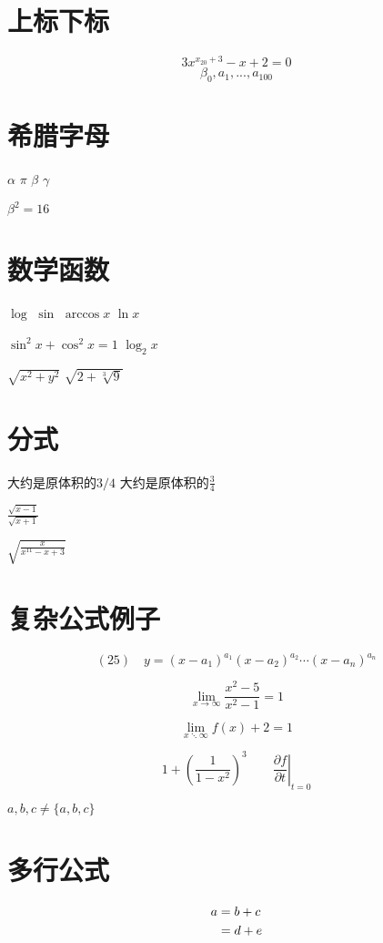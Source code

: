 \documentclass{article}
\begin{document}
	\section{上标下标}
	$$3x^{x_{20} + 3} - x + 2 = 0$$
	$$\beta_0,a_1,...,a_{100}$$
	\section{希腊字母} 
	$\alpha$
	$\pi$
	$\beta$
	$\gamma$

	$\beta^2 = 16$

	\section{数学函数}
	$\log$
	$\sin$
	$\arccos x$
	$\ln x$

	$\sin^2 x+\cos^2 x = 1$
	$\log_2 x$

	$\sqrt{x ^ 2 + y ^ 2}$
	$\sqrt{2 + \sqrt[3]{9}}$ %

	\section{分式}
	大约是原体积的$3/4$
	大约是原体积的$\frac{3}{4}$

	$\frac{\sqrt{x-1}}{\sqrt{x+1}}$

	$\sqrt{\frac{x}{x^{11} - x + 3}}$

	\section{复杂公式例子}

	\[
	(25)\quad y=\left(x-a_{1}\right)^{a_{1}}\left(x-a_{2}\right)^{a_{2}} \cdots\left(x-a_{n}\right)^{a_{n}}
	\]

	\[
	\lim _{x \rightarrow \infty} \frac{x^{2}-5}{x^{2}-1}=1
	\]

	$$\lim _{x \ddots \infty} {f(x)+ 2} = 1$$

	\[1 + \left(\frac{1}{1-x^{2}}
	\right)^3 \qquad
	\left.\frac{\partial f}{\partial t}
	\right|_{t=0}\]


	${a,b,c}\neq \{a,b,c\}$

	\section{多行公式}
	\begin{align} 
	a & = b + c \notag \\ 
	&=d+e 
	\end{align}
	
\end{document}
